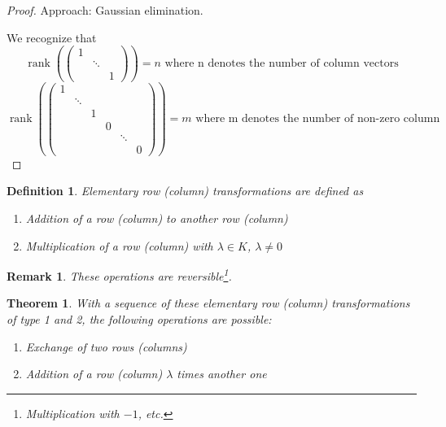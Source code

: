 \documentclass[a4paper,landscape,twocolumn]{article}
\newtheorem{theorem}{Theorem}[section]
\newtheorem{defi}{Definition}[section]
\newtheorem{rem}{Remark}[section]
\DeclareMathOperator\rank{rank} %
\begin{document}
\begin{proof}
  Approach: Gaussian elimination.

  We recognize that
  \[
    \rank\left(
    \begin{pmatrix}
      1 &  & \\
        & \ddots & \\
        &  & 1
    \end{pmatrix}\right)
    = n \text{ where n denotes the number of column vectors}
  \] \[
    \rank\left(
    \begin{pmatrix}
      1 &        &   &   &        & \\
        & \ddots &   &   &        & \\
        &        & 1 &   &        & \\
        &        &   & 0 &        & \\
        &        &   &   & \ddots & \\
        &        &   &   &        & 0
    \end{pmatrix}\right)
    = m \text{ where m denotes the number of non-zero column}
  \]
\end{proof}
%
\begin{defi}
  \label{defi-6.22}
  Elementary row (column) transformations are defined as
  \begin{enumerate}
    \item[1.] Addition of a row (column) to another row (column)
    \item[2.] Multiplication of a row (column) with $\lambda \in K$, $\lambda \neq 0$
  \end{enumerate}
\end{defi}
\begin{rem}
  These operations are reversible\footnote{Multiplication with $-1$, etc.}.
\end{rem}
%
\begin{theorem}
  \label{satz-6.23}
  With a sequence of these elementary row (column) transformations of type 1 and 2,
  the following operations are possible:
  \begin{enumerate}
    \item[3.] Exchange of two rows (columns)
    \item[4.] Addition of a row (column) $\lambda$ times another one
  \end{enumerate}
\end{theorem}
\end{document}
